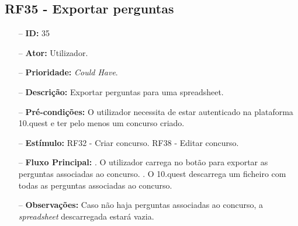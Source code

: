 \subsection{RF35 - Exportar perguntas}
\begin{itemize}
	\item[--] \textbf{ID:} 35
	\item[--]  \textbf{Ator:} Utilizador.
	\item[--]  \textbf{Prioridade:} \textit{Could Have}.
	\item[--]  \textbf{Descrição:} Exportar perguntas para uma spreadsheet.
	\item[--]  \textbf{Pré-condições:} O utilizador necessita de estar autenticado na plataforma 10.quest e ter pelo menos um concurso criado.
	\item[--]  \textbf{Estímulo:}  
	\subitem RF32 - Criar concurso.
	\subitem RF38 - Editar concurso.
	\item[--]  \textbf{Fluxo Principal:} 
	. O utilizador carrega no botão para exportar as perguntas associadas ao concurso.
	. O 10.quest descarrega um ficheiro  com todas as perguntas associadas ao concurso.
	\item[--]  \textbf{Observações:} Caso não haja perguntas associadas ao concurso, a  \textit{spreadsheet} descarregada estará vazia.
\end{itemize}
\newpage

